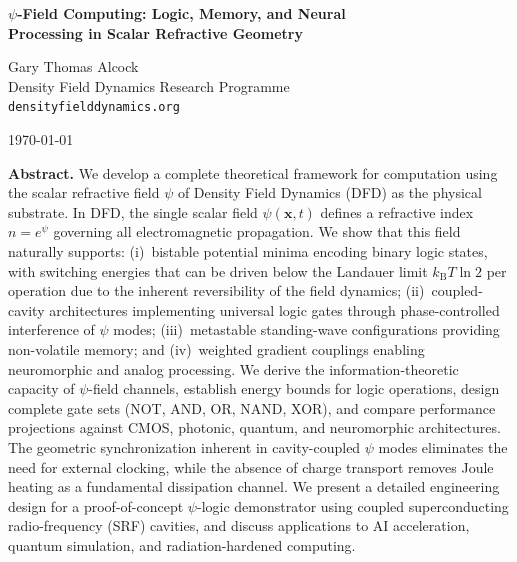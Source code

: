 \documentclass[12pt,a4paper,twoside]{article}
\newcommand{\psifield}{\psi}
\newcommand{\DFD}{DFD}
\newcommand{\kB}{k_{\mathrm{B}}}
\begin{document}
\begin{center}
{\LARGE\bfseries $\psifield$-Field Computing: Logic, Memory, and Neural\\[4pt]
Processing in Scalar Refractive Geometry}

\vspace{1em}

{\large Gary Thomas Alcock}\\[4pt]
{\small Density Field Dynamics Research Programme}\\[2pt]
{\small\texttt{densityfielddynamics.org}}

\vspace{1em}

{\small\today}

\vspace{1.5em}

\begin{minipage}{0.92\textwidth}
\small\textbf{Abstract.}
We develop a complete theoretical framework for computation using the scalar refractive field $\psi$ of Density Field Dynamics (\DFD) as the physical substrate. In \DFD{}, the single scalar field $\psi(\mathbf{x},t)$ defines a refractive index $n = e^\psi$ governing all electromagnetic propagation. We show that this field naturally supports: (i)~bistable potential minima encoding binary logic states, with switching energies that can be driven below the Landauer limit $\kB T \ln 2$ per operation due to the inherent reversibility of the field dynamics; (ii)~coupled-cavity architectures implementing universal logic gates through phase-controlled interference of $\psi$ modes; (iii)~metastable standing-wave configurations providing non-volatile memory; and (iv)~weighted gradient couplings enabling neuromorphic and analog processing. We derive the information-theoretic capacity of $\psi$-field channels, establish energy bounds for logic operations, design complete gate sets (NOT, AND, OR, NAND, XOR), and compare performance projections against CMOS, photonic, quantum, and neuromorphic architectures. The geometric synchronization inherent in cavity-coupled $\psi$ modes eliminates the need for external clocking, while the absence of charge transport removes Joule heating as a fundamental dissipation channel. We present a detailed engineering design for a proof-of-concept $\psi$-logic demonstrator using coupled superconducting radio-frequency (SRF) cavities, and discuss applications to AI acceleration, quantum simulation, and radiation-hardened computing.
\end{minipage}
\end{center}
\end{document}
